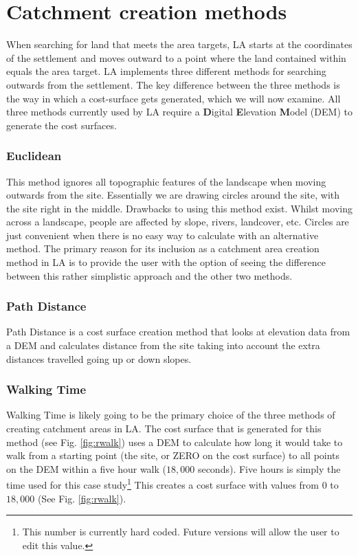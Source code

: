 \section{Catchment creation methods} 

When searching for land that meets the area targets, LA starts at
the coordinates of the settlement and moves outward to a point where the land
contained within equals the area target.  LA implements three
different methods for searching outwards from the settlement.  The key
difference between the three methods is the way in which a cost-surface gets
generated, which we will now examine.  All three methods currently used by LA
require a \textbf{D}igital \textbf{E}levation \textbf{M}odel (DEM) to generate
the cost surfaces.



  \subsubsection{Euclidean} \label{subsection:Euclidean} 
  
  This method ignores all topographic features of the landscape when moving
  outwards from the site.  Essentially we are drawing circles around the site,
  with the site right in the middle.  Drawbacks to using this method exist.
  Whilst moving across a landscape, people are affected by slope, rivers,
  landcover, etc.  Circles are just convenient when there is no easy way to
  calculate with an alternative method.  The primary reason for its inclusion
  as a catchment area creation method in LA is to provide the user
  with the option of seeing the difference between this rather simplistic
  approach and the other two methods.

  \subsubsection{Path Distance}
  
  Path Distance is a cost surface creation method that looks at elevation data
  from a DEM and calculates distance from the site taking into account the
  extra distances travelled going up or down slopes.

  \subsubsection{Walking Time}
  
  Walking Time is likely going to be the primary choice of the three methods of
  creating catchment areas in LA.  The cost surface that is
  generated for this method (see Fig. \ref{fig:rwalk}) uses a DEM to calculate
  how long it would take to walk from a starting point (the site, or ZERO on
  the cost surface) to all points on the DEM within a five hour walk ($18,000$
  seconds). Five hours is simply the time used for this case
  study\footnote{This number is currently hard coded. Future versions will
  allow the user to edit this value.} This creates a cost surface with values
  from $0$ to $18,000$ (See Fig. \ref{fig:rwalk}).  

